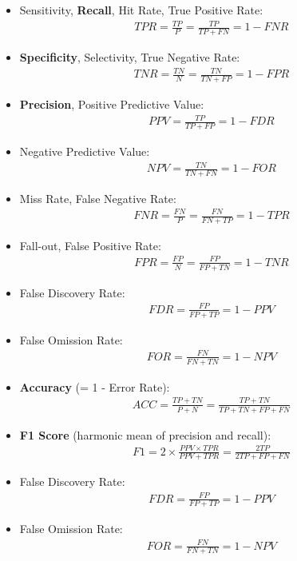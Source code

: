 \begin{itemize}
   \item Sensitivity, \textbf{Recall}, Hit Rate, True Positive Rate:
\begin{align*}
TPR = \frac{TP}{P} = \frac{TP}{TP+FN} = 1 - FNR
\end{align*}
   \item \textbf{Specificity}, Selectivity, True Negative Rate:
\begin{align*}
TNR = \frac{TN}{N} = \frac{TN}{TN+FP} = 1 - FPR
\end{align*}
   \item \textbf{Precision}, Positive Predictive Value:
\begin{align*}
PPV = \frac{TP}{TP+FP} = 1 - FDR
\end{align*}
   \item Negative Predictive Value:
\begin{align*}
NPV = \frac{TN}{TN+FN} = 1 - FOR
\end{align*}
   \item Miss Rate, False Negative Rate:
\begin{align*}
FNR = \frac{FN}{P} = \frac{FN}{FN + TP} = 1 - TPR
\end{align*}
   \item Fall-out, False Positive Rate:
\begin{align*}
FPR = \frac{FP}{N} = \frac{FP}{FP+TN} = 1 - TNR
\end{align*}
   \item False Discovery Rate:
\begin{align*}
FDR = \frac{FP}{FP+TP} = 1 - PPV
\end{align*}
   \item False Omission Rate:
\begin{align*}
FOR = \frac{FN}{FN+TN} = 1 - NPV
\end{align*}
   \item \textbf{Accuracy} (= 1 - Error Rate):
\begin{align*}
ACC = \frac{TP+TN}{P+N} = \frac{TP + TN}{TP + TN + FP + FN}
\end{align*}
   \item \textbf{F1 Score} (harmonic mean of precision and recall):
\begin{align*}
F1 = 2 \times \frac{PPV \times TPR}{PPV + TPR} = \frac{2 TP}{2TP + FP + FN}
\end{align*}
   \item False Discovery Rate:
\begin{align*}
FDR = \frac{FP}{FP+TP} = 1 - PPV
\end{align*}
   \item False Omission Rate:
\begin{align*}
FOR = \frac{FN}{FN+TN} = 1 - NPV
\end{align*}
\end{itemize}

